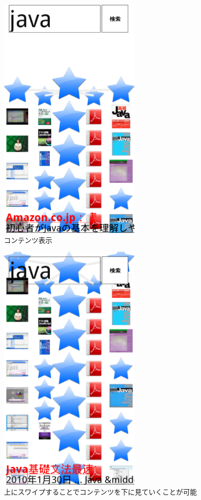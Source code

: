 \begin{figure}[htbp]
\begin{center}
\includegraphics[width=7cm]{le04.eps}
\caption{コンテンツ表示}
\label{le04}
\end{center}
\end{figure}

\begin{figure}[htbp]
\begin{center}
\includegraphics[width=7cm]{le05.eps}
\caption{上にスワイプすることでコンテンツを下に見ていくことが可能}
\label{le05}
\end{center}
\end{figure}

